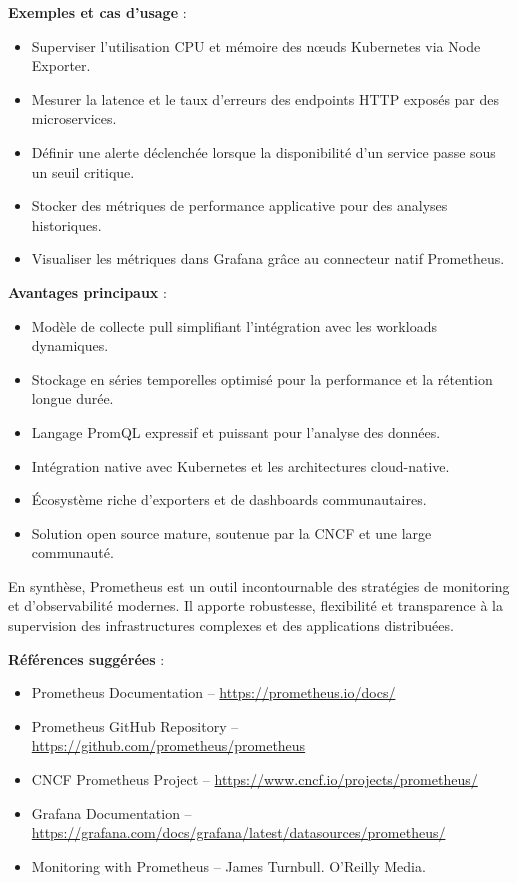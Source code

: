 \textbf{Exemples et cas d’usage} :
\begin{itemize}
	\item Superviser l’utilisation CPU et mémoire des nœuds Kubernetes via Node Exporter.
	\item Mesurer la latence et le taux d’erreurs des endpoints HTTP exposés par des microservices.
	\item Définir une alerte déclenchée lorsque la disponibilité d’un service passe sous un seuil critique.
	\item Stocker des métriques de performance applicative pour des analyses historiques.
	\item Visualiser les métriques dans Grafana grâce au connecteur natif Prometheus.
\end{itemize}

\textbf{Avantages principaux} :
\begin{itemize}
	\item Modèle de collecte pull simplifiant l’intégration avec les workloads dynamiques.
	\item Stockage en séries temporelles optimisé pour la performance et la rétention longue durée.
	\item Langage PromQL expressif et puissant pour l’analyse des données.
	\item Intégration native avec Kubernetes et les architectures cloud-native.
	\item Écosystème riche d’exporters et de dashboards communautaires.
	\item Solution open source mature, soutenue par la CNCF et une large communauté.
\end{itemize}

En synthèse, Prometheus est un outil incontournable des stratégies de monitoring et d’observabilité modernes. Il apporte robustesse, flexibilité et transparence à la supervision des infrastructures complexes et des applications distribuées.

\textbf{Références suggérées} :
\begin{itemize}
	\item Prometheus Documentation – \url{https://prometheus.io/docs/}
	\item Prometheus GitHub Repository – \url{https://github.com/prometheus/prometheus}
	\item CNCF Prometheus Project – \url{https://www.cncf.io/projects/prometheus/}
	\item Grafana Documentation – \url{https://grafana.com/docs/grafana/latest/datasources/prometheus/}
	\item Monitoring with Prometheus – James Turnbull. O’Reilly Media.
\end{itemize}

